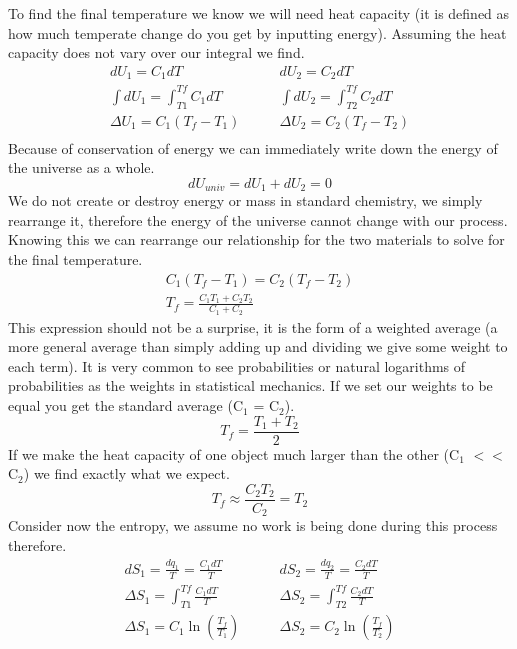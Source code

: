 \documentclass{article}
\begin{document}
To find the final temperature we know we will need heat capacity (it is defined as how much temperate change do you get by inputting energy). 
Assuming the heat capacity does not vary over our integral we find.
\begin{equation}
\begin{split}
    dU_1 = C_1dT &\qquad dU_2 = C_2dT \\
    \int dU_1 = \int_{T1}^{Tf} C_1dT &\qquad \int dU_2 = \int_{T2}^{Tf} C_2dT \\
    \Delta U_1 = C_1(T_f-T_1) &\qquad \Delta U_2 = C_2  (T_f-T_2) \\
    \end{split}
\end{equation}
Because of conservation of energy we can immediately write down the energy of the universe as a whole. 
\begin{equation}
    dU_{univ} = dU_1 + dU_2 = 0
\end{equation}
 We do not create or destroy energy or mass in standard chemistry, we simply rearrange it, therefore the energy of the universe cannot change with our process. 
 Knowing this we can rearrange our relationship for the two materials to solve for the final temperature. 
 \begin{equation}
     \begin{split}
         C_1(T_f-T_1) =  C_2 (T_f-T_2) \\
         T_f = \frac{C_1T_1 + C_2T_2}{C_1+C_2}
     \end{split}
 \end{equation}
 This expression should not be a surprise, it is the form of a weighted average (a more general average than simply adding up and dividing we give some weight to each term). 
 It is very common to see probabilities or natural logarithms of probabilities as the weights in statistical mechanics. 
 If we set our weights to be equal you get the standard average (C$_1$ = C$_2$). 
 \begin{equation}
     T_f = \frac{T_1+T_2}{2}
 \end{equation}
 If we make the heat capacity of one object much larger than the other (C$_1$ $<<$ C$_2$) we find exactly what we expect. 
 \begin{equation}
     T_f \approx \frac{C_2T_2}{C_2} = T_2
 \end{equation}
 Consider now the entropy, we assume no work is being done during this process therefore. 
 \begin{equation}
 \begin{split}
     dS_1 = \frac{dq_1}{T} = \frac{C_1dT}{T} &\qquad dS_2 = \frac{dq_2}{T} = \frac{C_2dT}{T} \\
       \Delta S_1 = \int_{T1}^{Tf} \frac{C_1dT}{T} &\qquad \Delta S_2 = \int_{T2}^{Tf}\frac{C_2dT}{T} \\
       \Delta S_1 = C_1\ln \left(\frac{T_f}{T_1}\right) &\qquad \Delta S_2 = C_2\ln \left(\frac{T_f}{T_2}\right)
     \end{split}
 \end{equation}
\end{document}
